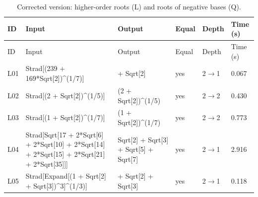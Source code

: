 \begin{longtable}{@{}p{}>{\ttfamily\footnotesize\raggedright\arraybackslash}p{}>{\ttfamily\footnotesize\raggedright\arraybackslash}p{}p{}p{}p{}@{}}
\caption{Corrected version: higher-order roots (L) and roots of negative bases (Q).}\label{tab:fixedLQ}\\
\toprule ID & Input & Output & Equal & Depth & Time (s)\\\midrule\endfirsthead
\toprule ID & Input & Output & Equal & Depth & Time (s)\\\midrule\endhead
\bottomrule\endfoot
L01 & Strad[\allowbreak{}(\allowbreak{}239 +\allowbreak{} 169*\allowbreak{}Sqrt[\allowbreak{}2]\allowbreak{})\allowbreak{}\textasciicircum{}\allowbreak{}(\allowbreak{}1/\allowbreak{}7)\allowbreak{}]\allowbreak{} & 1 +\allowbreak{} Sqrt[\allowbreak{}2]\allowbreak{} & yes & 2$\to$1 & 0.067\\
L02 & Strad[\allowbreak{}(\allowbreak{}2 +\allowbreak{} Sqrt[\allowbreak{}2]\allowbreak{})\allowbreak{}\textasciicircum{}\allowbreak{}(\allowbreak{}1/\allowbreak{}5)\allowbreak{}]\allowbreak{} & (\allowbreak{}2 +\allowbreak{} Sqrt[\allowbreak{}2]\allowbreak{})\allowbreak{}\textasciicircum{}\allowbreak{}(\allowbreak{}1/\allowbreak{}5)\allowbreak{} & yes & 2$\to$2 & 0.430\\
L03 & Strad[\allowbreak{}(\allowbreak{}1 +\allowbreak{} Sqrt[\allowbreak{}2]\allowbreak{})\allowbreak{}\textasciicircum{}\allowbreak{}(\allowbreak{}1/\allowbreak{}7)\allowbreak{}]\allowbreak{} & (\allowbreak{}1 +\allowbreak{} Sqrt[\allowbreak{}2]\allowbreak{})\allowbreak{}\textasciicircum{}\allowbreak{}(\allowbreak{}1/\allowbreak{}7)\allowbreak{} & yes & 2$\to$2 & 0.773\\
L04 & Strad[\allowbreak{}Sqrt[\allowbreak{}17 +\allowbreak{} 2*\allowbreak{}Sqrt[\allowbreak{}6]\allowbreak{} +\allowbreak{} 2*\allowbreak{}Sqrt[\allowbreak{}10]\allowbreak{} +\allowbreak{} 2*\allowbreak{}Sqrt[\allowbreak{}14]\allowbreak{} +\allowbreak{} 2*\allowbreak{}Sqrt[\allowbreak{}15]\allowbreak{} +\allowbreak{} 2*\allowbreak{}Sqrt[\allowbreak{}21]\allowbreak{} +\allowbreak{} 2*\allowbreak{}Sqrt[\allowbreak{}35]\allowbreak{}]\allowbreak{}]\allowbreak{} & Sqrt[\allowbreak{}2]\allowbreak{} +\allowbreak{} Sqrt[\allowbreak{}3]\allowbreak{} +\allowbreak{} Sqrt[\allowbreak{}5]\allowbreak{} +\allowbreak{} Sqrt[\allowbreak{}7]\allowbreak{} & yes & 2$\to$1 & 2.916\\
L05 & Strad[\allowbreak{}Expand[\allowbreak{}(\allowbreak{}1 +\allowbreak{} Sqrt[\allowbreak{}2]\allowbreak{} +\allowbreak{} Sqrt[\allowbreak{}3]\allowbreak{})\allowbreak{}\textasciicircum{}\allowbreak{}3]\allowbreak{}\textasciicircum{}\allowbreak{}(\allowbreak{}1/\allowbreak{}3)\allowbreak{}]\allowbreak{} & 1 +\allowbreak{} Sqrt[\allowbreak{}2]\allowbreak{} +\allowbreak{} Sqrt[\allowbreak{}3]\allowbreak{} & yes & 2$\to$1 & 0.118\\

\end{longtable}
